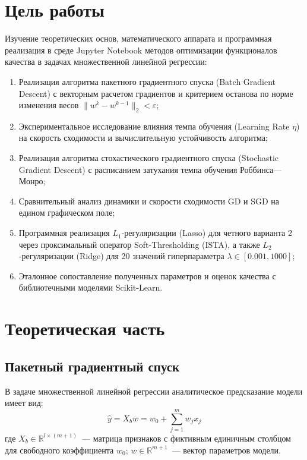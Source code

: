 \documentclass[14pt,a4paper]{extarticle}
\begin{document}
\setcounter{page}{2}

\section{Цель работы}
Изучение теоретических основ, математического аппарата и программная реализация в среде Jupyter Notebook методов оптимизации функционалов качества в задачах множественной линейной регрессии:
\begin{enumerate}
    \item Реализация алгоритма пакетного градиентного спуска (Batch Gradient Descent) с векторным расчетом градиентов и критерием останова по норме изменения весов $\|w^k - w^{k-1}\|_2 < \varepsilon$;
    \item Экспериментальное исследование влияния темпа обучения (Learning Rate $\eta$) на скорость сходимости и вычислительную устойчивость алгоритма;
    \item Реализация алгоритма стохастического градиентного спуска (Stochastic Gradient Descent) с расписанием затухания темпа обучения Роббинса---Монро;
    \item Сравнительный анализ динамики и скорости сходимости GD и SGD на едином графическом поле;
    \item Программная реализация $L_1$-регуляризации (Lasso) для четного варианта 2 через проксимальный оператор Soft-Thresholding (ISTA), а также $L_2$-регуляризации (Ridge) для 20 значений гиперпараметра $\lambda \in [0.001, 1000]$;
    \item Эталонное сопоставление полученных параметров и оценок качества с библиотечными моделями Scikit-Learn.
\end{enumerate}

\section{Теоретическая часть}

\subsection{Пакетный градиентный спуск}
В задаче множественной линейной регрессии аналитическое предсказание модели имеет вид:
\begin{equation}
    \hat{y} = X_b w = w_0 + \sum_{j=1}^m w_j x_j
\end{equation}
где $X_b \in \mathbb{R}^{l \times (m+1)}$~--- матрица признаков с фиктивным единичным столбцом для свободного коэффициента $w_0$; $w \in \mathbb{R}^{m+1}$~--- вектор параметров модели.
\end{document}
